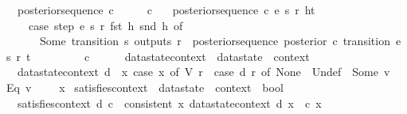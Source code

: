 \begin{isabellebody}
\ \ {\isachardoublequoteopen}posterior{\isacharunderscore}sequence\ c\ {\isacharunderscore}\ {\isacharunderscore}\ {\isacharunderscore}\ {\isacharbrackleft}{\isacharbrackright}\ {\isacharequal}\ c{\isachardoublequoteclose}\ {\isacharbar}\isanewline
\ \ {\isachardoublequoteopen}posterior{\isacharunderscore}sequence\ c\ e\ s\ r\ {\isacharparenleft}h{\isacharhash}t{\isacharparenright}\ {\isacharequal}\isanewline
\ \ \ \ {\isacharparenleft}case\ {\isacharparenleft}step\ e\ s\ r\ {\isacharparenleft}fst\ h{\isacharparenright}\ {\isacharparenleft}snd\ h{\isacharparenright}{\isacharparenright}\ of\isanewline
\ \ \ \ \ \ {\isacharparenleft}Some\ {\isacharparenleft}transition{\isacharcomma}\ s{\isacharprime}{\isacharcomma}\ outputs{\isacharcomma}\ r{\isacharprime}{\isacharparenright}{\isacharparenright}\ {\isasymRightarrow}\ {\isacharparenleft}posterior{\isacharunderscore}sequence\ {\isacharparenleft}posterior\ c\ transition{\isacharparenright}\ e\ s{\isacharprime}\ r{\isacharprime}\ t{\isacharparenright}\ {\isacharbar}\isanewline
\ \ \ \ \ \ {\isacharunderscore}\ {\isasymRightarrow}\ c\isanewline
\ \ \ \ {\isacharparenright}{\isachardoublequoteclose}\isanewline
\isanewline
{}\isamarkupfalse%
\ datastate{}context\ {\isacharcolon}{\isacharcolon}\ {\isachardoublequoteopen}datastate\ {\isasymRightarrow}\ context{\isachardoublequoteclose}\ \isanewline
\ \ {\isachardoublequoteopen}datastate{}context\ d\ {\isacharequal}\ {\isacharparenleft}{\isasymlambda}x{\isachardot}\ case\ x\ of\ V\ r\ {\isasymRightarrow}\ {\isacharparenleft}case\ d\ r\ of\ None\ {\isasymRightarrow}\ {\isacharbraceleft}{\isacharbar}Undef{\isacharbar}{\isacharbraceright}\ {\isacharbar}\ Some\ v\ {\isasymRightarrow}\ {\isacharbraceleft}{\isacharbar}Eq\ v{\isacharbar}{\isacharbraceright}{\isacharparenright}\ {\isacharbar}\ {\isacharunderscore}\ {\isasymRightarrow}\ {\isasymlbrakk}{\isasymrbrakk}\ x{\isacharparenright}{\isachardoublequoteclose}\isanewline
\isanewline
{}\isamarkupfalse%
\ satisfies{\isacharunderscore}context\ {\isacharcolon}{\isacharcolon}\ {\isachardoublequoteopen}datastate\ {\isasymRightarrow}\ context\ {\isasymRightarrow}\ bool{\isachardoublequoteclose}\ \isanewline
\ \ {\isachardoublequoteopen}satisfies{\isacharunderscore}context\ d\ c\ {\isacharequal}\ consistent\ {\isacharparenleft}{\isasymlambda}x{\isachardot}\ {\isacharparenleft}datastate{}context\ d\ x{\isacharparenright}\ {\isacharbar}{\isasymunion}{\isacharbar}\ c\ x{\isacharparenright}{\isachardoublequoteclose}\isanewline

\end{isabellebody}
